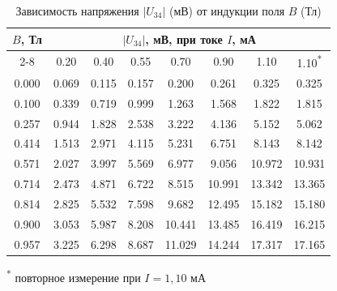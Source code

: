 \documentclass[a4paper,12pt]{article}
\begin{document}
\begin{table}[H]
    \centering
    \caption{Зависимость напряжения $|U_{34}|$ (мВ) от индукции поля $B$ (Тл)}
    \label{tab:hall}
    \small
    \setlength{\tabcolsep}{5pt}
    \begin{tabular}{c|*{7}{c}}
        \toprule
        \multirow{2}{*}{$B$, Тл} & \multicolumn{7}{c}{$|U_{34}|$, мВ, при токе $I$, мА} \\
        \cmidrule(lr){2-8}
         & 0.20 & 0.40 & 0.55 & 0.70 & 0.90 & 1.10 & 1.10\textsuperscript{*} \\
        \midrule
        0.000 & 0.069 & 0.115 & 0.157 & 0.200 & 0.261 & 0.325 & 0.325 \\
        0.100 & 0.339 & 0.719 & 0.999 & 1.263 & 1.568 & 1.822 & 1.815 \\
        0.257 & 0.944 & 1.828 & 2.538 & 3.222 & 4.136 & 5.152 & 5.062 \\
        0.414 & 1.513 & 2.971 & 4.115 & 5.231 & 6.751 & 8.143 & 8.142 \\
        0.571 & 2.027 & 3.997 & 5.569 & 6.977 & 9.056 & 10.972 & 10.931 \\
        0.714 & 2.473 & 4.871 & 6.722 & 8.515 & 10.991 & 13.342 & 13.365 \\
        0.814 & 2.825 & 5.532 & 7.598 & 9.682 & 12.495 & 15.182 & 15.180 \\
        0.900 & 3.053 & 5.987 & 8.208 & 10.441 & 13.485 & 16.419 & 16.215 \\
        0.957 & 3.225 & 6.298 & 8.687 & 11.029 & 14.244 & 17.317 & 17.165 \\
        \bottomrule
    \end{tabular}
    \par\vspace{2pt}
    {\footnotesize\textsuperscript{*} повторное измерение при $I = 1{,}10$ мА}
\end{table}
\end{document}
